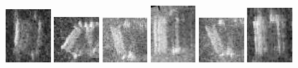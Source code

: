 \begin{figure}
    \includegraphics[width=0.15\textwidth]{chapters/images/dataset/all-class-images/can/can-156.jpg}
    \includegraphics[width=0.15\textwidth]{chapters/images/dataset/all-class-images/can/can-65.jpg}
    \includegraphics[width=0.15\textwidth]{chapters/images/dataset/all-class-images/can/can-255.jpg}
    \includegraphics[width=0.15\textwidth]{chapters/images/dataset/all-class-images/can/can-358.jpg}
    \includegraphics[width=0.15\textwidth]{chapters/images/dataset/all-class-images/can/can-214.jpg}
    \includegraphics[width=0.15\textwidth]{chapters/images/dataset/all-class-images/can/can-86.jpg}
    

\end{figure}
